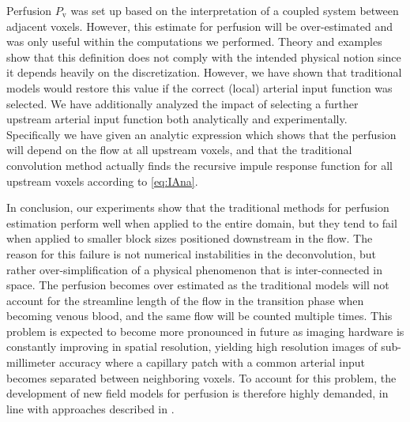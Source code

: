 \documentclass[journal,twocolumn]{IEEEtran}
\newcommand{\Perfv}{P_{\mathrm{v}}}
\begin{document}
	Perfusion $\Perfv$ was set up based on the interpretation of a coupled system between adjacent voxels. However, this estimate for perfusion will be over-estimated and was only useful within the computations we performed.
	Theory and examples show that this definition does not comply with the intended physical notion since it depends heavily on the discretization.
	However, we have shown that traditional models would restore this value if the correct (local) arterial input function was selected.
	We have additionally analyzed the impact of selecting a further upstream arterial input function both analytically and experimentally.
	Specifically we have given an analytic expression which shows that the perfusion will depend on the flow at all upstream voxels, and that the traditional convolution method actually finds the recursive impule response function for all upstream voxels according to \eqref{eq:IAna}.
	
	In conclusion, our experiments show that the traditional methods for perfusion estimation perform well when applied to the entire domain, but they tend to fail when applied to smaller block sizes positioned downstream in the flow. The reason for this failure is not numerical instabilities in the deconvolution, but rather over-simplification of a physical phenomenon that is inter-connected in space.  The perfusion becomes over estimated as the traditional models will not account for the streamline length of the flow in the transition phase when becoming venous blood, and the same flow will be counted multiple times. This problem is expected to become more pronounced in future as imaging hardware is constantly improving in spatial resolution, yielding high resolution images of sub-millimeter accuracy where a capillary patch with a common arterial input becomes separated between neighboring voxels. 
	To account for this problem, the development of new field models for perfusion is therefore highly demanded, in line with approaches described in \cite{sourbron14,Michler2013}. 	
	
	


	
		
	
	
\end{document}
